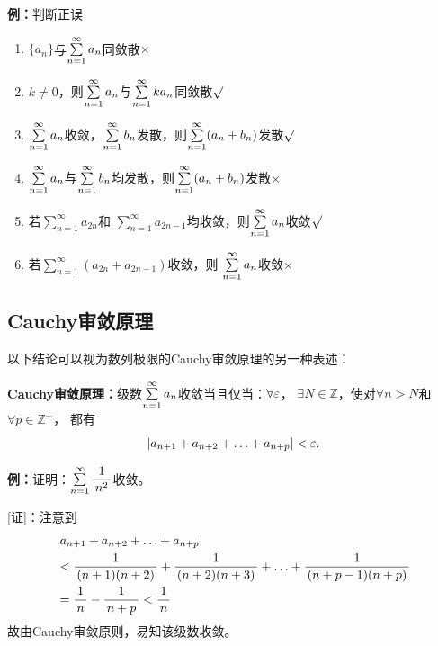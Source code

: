 {\bf 例：}判断正误
\begin{enumerate}[(1)]
  \setlength{\itemindent}{1cm}
  \item $\{a_n\}$与$\sum\limits_{n=1}^{\infty} a_n$同敛散\hfill$\times$
  \item $k\ne 0$，则$\sum\limits_{n=1}^{\infty} a_n$与$\sum\limits_{n=1}^{\infty} ka_n$同敛散\hfill$\surd$
  \item $\sum\limits_{n=1}^{\infty} a_n$收敛，$\sum\limits_{n=1}^{\infty} b_n$发散，则$\sum\limits_{n=1}^{\infty}(a_n+b_n)$发散\hfill$\surd$
  \item $\sum\limits_{n=1}^{\infty} a_n$与$\sum\limits_{n=1}^{\infty} b_n$均发散，则$\sum\limits_{n=1}^{\infty}(a_n+b_n)$发散\hfill$\times$
  \item 若$\sum\limits_{n=1}^{\infty}a_{2n}$和
  $\sum\limits_{n=1}^{\infty}a_{2n-1}$均收敛，则$\sum\limits_{n=1}^{\infty} a_n$收敛\hfill$\surd$
  \item 若$\sum\limits_{n=1}^{\infty}(a_{2n}+a_{2n-1})$收敛，则
  $\sum\limits_{n=1}^{\infty} a_n$收敛\hfill$\times$
\end{enumerate}

\subsection{Cauchy审敛原理}

以下结论可以视为数列极限的Cauchy审敛原理的另一种表述：
\begin{thx}
	{\bf Cauchy审敛原理：}级数$\sum\limits_{n=1}^{\infty} a_n$收敛当且仅当：$\forall\varepsilon$，
    $\exists N\in\mathbb{Z}$，使对$\forall n>N$和$\forall p\in\mathbb{Z}^+$，
    都有
    $$|a_{n+1}+a_{n+2}+\ldots+a_{n+p}|<\varepsilon.$$
\end{thx}

{\bf 例：}证明：$\sum\limits_{n=1}^{\infty}\displaystyle\frac{\,{1}\,}{\,{n^2}\,}$收敛。

[证]：注意到
\begin{align}
	&|a_{n+1}+a_{n+2}+\ldots+a_{n+p}|\notag\\
	&<\displaystyle\frac{\,{1}\,}{\,{(n+1)(n+2)}\,}+\displaystyle\frac{\,{1}\,}{\,{(n+2)(n+3)}\,}+\ldots+\displaystyle\frac{\,{1}\,}{\,{(n+p-1)(n+p)}\,}\notag\\
	&=\displaystyle\frac{\,{1}\,}{\,{n}\,}-\displaystyle\frac{\,{1}\,}{\,{n+p}\,}<\displaystyle\frac{\,{1}\,}{\,{n}\,}\notag
\end{align}
故由Cauchy审敛原则，易知该级数收敛。\fin

